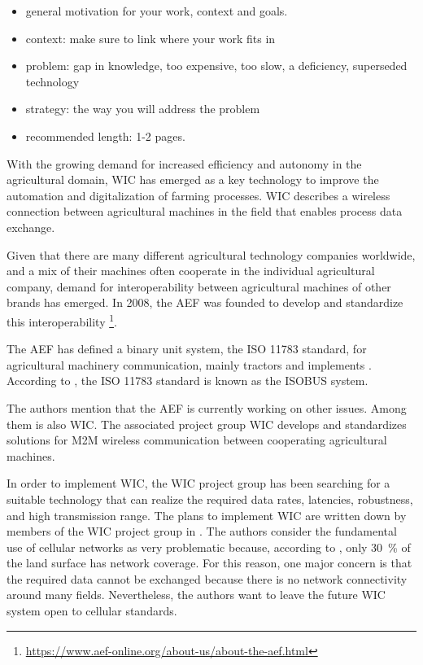 
\begin{itemize}
\item general motivation for your work, context and goals.
\item context: make sure to link where your work fits in
\item problem: gap in knowledge, too expensive, too slow, a deficiency, superseded technology
\item strategy: the way you will address the problem
\item recommended length: 1-2 pages.
\end{itemize}
With the growing demand for increased efficiency and autonomy in the agricultural domain, \ac{WIC} has emerged as a key technology to improve the automation
and digitalization of farming processes. \ac{WIC} describes a wireless connection between agricultural machines
in the field that enables process data exchange.

Given that there are many different agricultural technology companies worldwide, and a mix of their machines often cooperate in
the individual agricultural company, demand for interoperability between agricultural machines of other brands
has emerged.
In 2008, the \ac{AEF} was founded to develop and standardize this interoperability
\footnote{\url{https://www.aef-online.org/about-us/about-the-aef.html}}.

The AEF has defined a binary unit system, the ISO 11783 standard, for agricultural machinery communication, mainly tractors and
implements \cite{iglesias_enabling_2014}.
According to \textcite{schlingmann_aef_2019}, the ISO 11783 standard is known as
the ISOBUS system.

The authors mention that the AEF is currently working on other issues.
Among them is also \ac{WIC}.
The associated project group \ac{WIC} develops and standardizes solutions for \ac{M2M} wireless
communication between cooperating agricultural machines.

In order to implement \ac{WIC}, the \ac{WIC} project group has been searching for a suitable technology
that can realize the required data rates, latencies, robustness, and high transmission range.
The plans to implement \ac{WIC} are written down by members of the \ac{WIC} project group in \cite{schlingmann_challenges_2017}.
The authors consider the fundamental use of cellular networks as very problematic
because, according to \cite{itu2016facts}, only \SI{30}{\percent} of the land surface has network coverage.
For this reason, one major concern is that the required data cannot be exchanged because there is
no network connectivity around many fields.
Nevertheless, the authors want to leave the future \ac{WIC} system open
to cellular standards.

